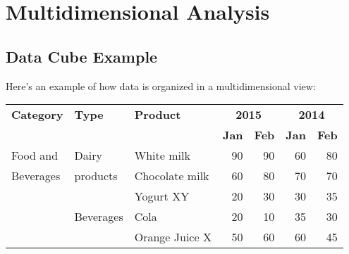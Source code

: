 \section{Multidimensional Analysis}

\subsection{Data Cube Example}
Here's an example of how data is organized in a multidimensional view:

\begin{center}
\begin{tabular}{|l|l|l|r|r|r|r|}
    \hline
    \textbf{Category} & \textbf{Type} & \textbf{Product} & \multicolumn{2}{c|}{\textbf{2015}} & \multicolumn{2}{c|}{\textbf{2014}} \\
    \cline{4-7}
    & & & \textbf{Jan} & \textbf{Feb} & \textbf{Jan} & \textbf{Feb} \\
    \hline
    Food and & Dairy & White milk & 90 & 90 & 60 & 80 \\
    Beverages & products & Chocolate milk & 60 & 80 & 70 & 70 \\
    & & Yogurt XY & 20 & 30 & 30 & 35 \\
    \cline{2-7}
    & Beverages & Cola & 20 & 10 & 35 & 30 \\
    & & Orange Juice X & 50 & 60 & 60 & 45 \\
    \hline
\end{tabular}
\end{center}

